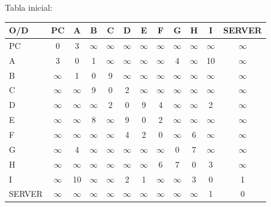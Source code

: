 \documentclass{article}
\begin{document}
Tabla inicial:\\
\begin{tabular}{||l | c | c | c | c | c | c | c | c | c | c | c ||}
\hline
\hline
O/D & PC & A & B & C & D & E & F & G & H & I & SERVER \\
\hline
PC & 0 & 3 & $\infty$ & $\infty$ & $\infty$ & $\infty$ & $\infty$ & $\infty$ & $\infty$ & $\infty$ & $\infty$ \\
\hline
A & 3 & 0 & 1 & $\infty$ & $\infty$ & $\infty$ & $\infty$ & 4 & $\infty$ & 10 & $\infty$ \\
\hline
B & $\infty$ & 1 & 0 & 9 & $\infty$ & $\infty$ & $\infty$ & $\infty$ & $\infty$ & $\infty$ & $\infty$ \\
\hline
C & $\infty$ & $\infty$ & 9 & 0 & 2 & $\infty$ & $\infty$ & $\infty$ & $\infty$ & $\infty$ & $\infty$ \\
\hline
D & $\infty$ & $\infty$ & $\infty$ & 2 & 0 & 9 & 4 & $\infty$ & $\infty$ & 2 & $\infty$ \\
\hline
E & $\infty$ & $\infty$ & 8 & $\infty$ & 9 & 0 & 2 & $\infty$ & $\infty$ & $\infty$ & $\infty$ \\
\hline
F & $\infty$ & $\infty$ & $\infty$ & $\infty$ & 4 & 2 & 0 & $\infty$ & 6 & $\infty$ & $\infty$ \\
\hline
G & $\infty$ & 4 & $\infty$ & $\infty$ & $\infty$ & $\infty$ & $\infty$ & 0 & 7 & $\infty$ & $\infty$ \\
\hline
H & $\infty$ & $\infty$ & $\infty$ & $\infty$ & $\infty$ & $\infty$ & 6 & 7 & 0 & 3 & $\infty$ \\
\hline
I & $\infty$ & 10 & $\infty$ & $\infty$ & 2 & 1 & $\infty$ & $\infty$ & 3 & 0 & 1 \\
\hline
SERVER & $\infty$ & $\infty$ & $\infty$ & $\infty$ & $\infty$ & $\infty$ & $\infty$ & $\infty$ & $\infty$ & 1 & 0 \\
\hline
\end{tabular}\\
\end{document}
